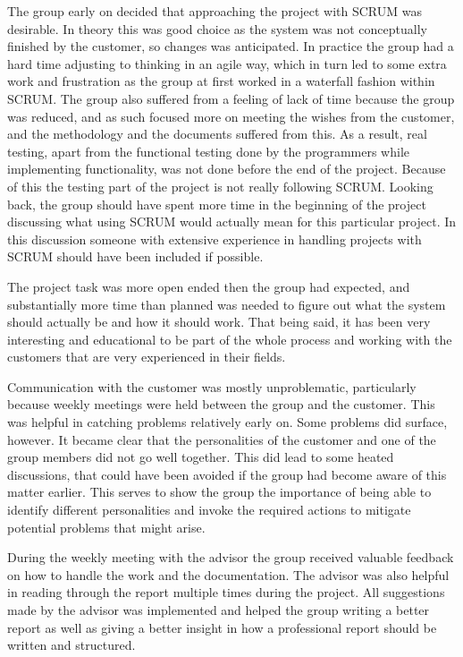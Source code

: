\documentclass[11pt]{article}
\begin{document}
The group early on decided that approaching the project with SCRUM was desirable. In theory this was good choice as the system was not conceptually finished by the customer, so changes was anticipated. In practice the group had a hard time adjusting to thinking in an agile way, which in turn led to some extra work and frustration as the group at first worked in a waterfall fashion within SCRUM. The group also suffered from a feeling of lack of time because the group was reduced, and as such focused more on meeting the wishes from the customer, and the methodology and the documents suffered from this. As a result, real testing, apart from the functional testing done by the programmers while implementing functionality, was not done before the end of the project. Because of this the testing part of the project is not really following SCRUM. Looking back, the group should have spent more time in the beginning of the project discussing what using SCRUM would actually mean for this particular project. In this discussion someone with extensive experience in handling projects with SCRUM should have been included if possible.

The project task was more open ended then the group had expected, and substantially more time than planned was needed to figure out what the system should actually be and how it should work. That being said, it has been very interesting and educational to be part of the whole process and working with the customers that are very experienced in their fields.

Communication with the customer was mostly unproblematic, particularly because weekly meetings were held between the group and the customer. This was helpful in catching problems relatively early on. Some problems did surface, however. It became clear that the personalities of the customer and one of the group members did not go well together. This did lead to some heated discussions, that could have been avoided if the group had become aware of this matter earlier. This serves to show the group the importance of being able to identify different personalities and invoke the required actions to mitigate potential problems that might arise.

During the weekly meeting with the advisor the group received valuable feedback on how to handle the work and the documentation. The advisor was also helpful in reading through the report multiple times during the project. All suggestions made by the advisor was implemented and helped the group writing a better report as well as giving a better insight in how a professional report should be written and structured.
\end{document}
